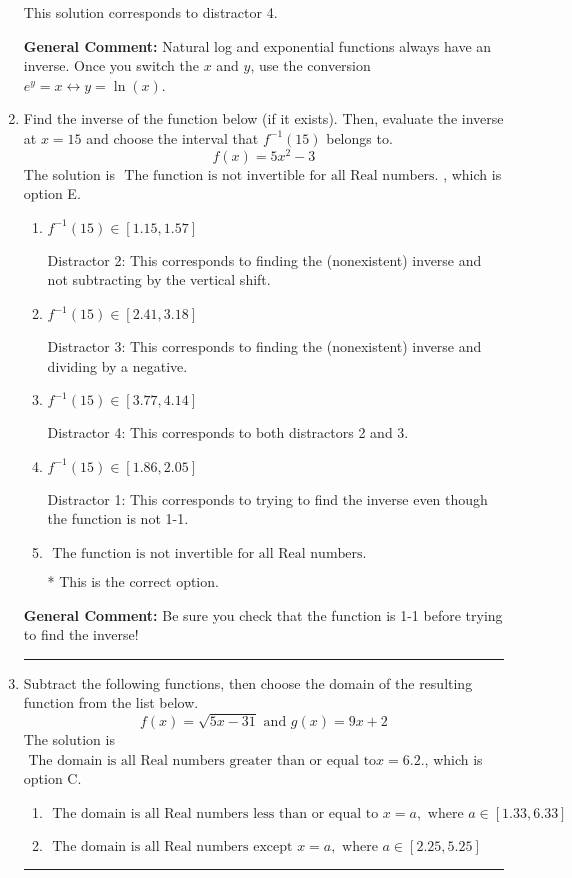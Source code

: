 \documentclass{extbook}[14pt]
\newcommand{\litem}[1]{\item #1

\rule{\textwidth}{0.4pt}}
\begin{document}
\begin{enumerate}
{\begin{enumerate}[label=\Alph*.]
 This solution corresponds to distractor 4.
\end{enumerate}

\textbf{General Comment:} Natural log and exponential functions always have an inverse. Once you switch the $x$ and $y$, use the conversion $ e^y = x \leftrightarrow y=\ln(x)$.
}
\litem{
Find the inverse of the function below (if it exists). Then, evaluate the inverse at $x = 15$ and choose the interval that $f^{-1}(15)$ belongs to.
\[ f(x) = 5 x^2 - 3 \]The solution is \( \text{ The function is not invertible for all Real numbers. } \), which is option E.\begin{enumerate}[label=\Alph*.]
\item \( f^{-1}(15) \in [1.15, 1.57] \)

 Distractor 2: This corresponds to finding the (nonexistent) inverse and not subtracting by the vertical shift.
\item \( f^{-1}(15) \in [2.41, 3.18] \)

 Distractor 3: This corresponds to finding the (nonexistent) inverse and dividing by a negative.
\item \( f^{-1}(15) \in [3.77, 4.14] \)

 Distractor 4: This corresponds to both distractors 2 and 3.
\item \( f^{-1}(15) \in [1.86, 2.05] \)

 Distractor 1: This corresponds to trying to find the inverse even though the function is not 1-1. 
\item \( \text{ The function is not invertible for all Real numbers. } \)

* This is the correct option.
\end{enumerate}

\textbf{General Comment:} Be sure you check that the function is 1-1 before trying to find the inverse!
}
\litem{
Subtract the following functions, then choose the domain of the resulting function from the list below.
\[ f(x) = \sqrt{5x-31}  \text{ and } g(x) = 9x + 2 \]The solution is \( \text{ The domain is all Real numbers greater than or equal to} x = 6.2. \), which is option C.\begin{enumerate}[label=\Alph*.]
\item \( \text{ The domain is all Real numbers less than or equal to } x = a, \text{ where } a \in [1.33, 6.33] \)


\item \( \text{ The domain is all Real numbers except } x = a, \text{ where } a \in [2.25, 5.25] \)



\end{enumerate}}
\end{enumerate}
\end{document}
